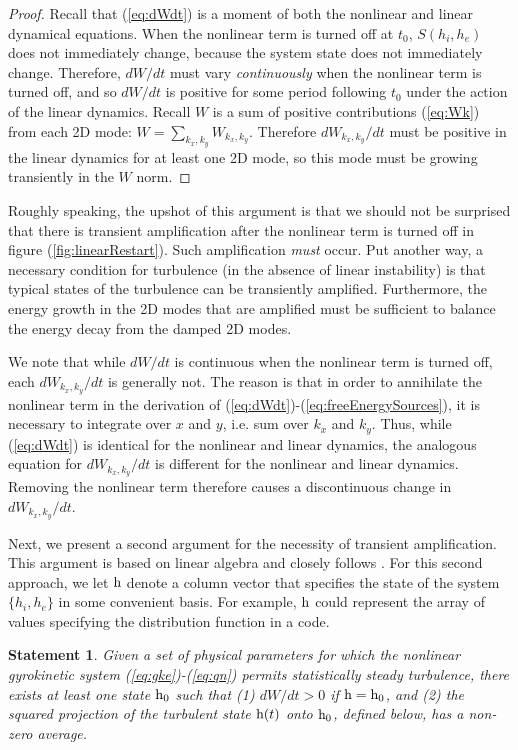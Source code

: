 \documentclass{jpp}
\newtheorem{statement}{Statement}
\begin{document}
\begin{proof}
Recall that (\ref{eq:dWdt}) is a moment of both the nonlinear and linear dynamical equations.
When the nonlinear term is turned off at $t_0$, $S(h_i,h_e)$ does not immediately change, because
the system state does not immediately change. Therefore, $dW/dt$ must vary \emph{continuously}
when the nonlinear term is turned off, and so $dW/dt$ is positive for some period following $t_0$ under the
action of the linear dynamics.
Recall $W$ is a sum of positive contributions (\ref{eq:Wk}) from each 2D mode:
$W = \sum_{k_x,k_y} W_{k_x,k_y}$.
Therefore $dW_{k_x,k_y}/dt$ must be positive in the linear dynamics for at least one 2D mode,
so this mode must be growing transiently in the $W$ norm.
\end{proof}

Roughly speaking, the upshot of this argument is that we should not be surprised that there is transient amplification
after the nonlinear term is turned off in figure (\ref{fig:linearRestart}).
Such amplification \emph{must} occur.
Put another way, a necessary condition
for turbulence (in the absence of linear instability) is that typical states of the turbulence
can be transiently amplified. Furthermore, the energy growth in the 2D modes that are amplified
must be sufficient to balance the energy decay from the damped 2D modes.

We note that while $dW/dt$ is continuous when the nonlinear term is
turned off, each $dW_{k_x,k_y}/dt$ is generally not. The reason is
that in order to annihilate the nonlinear term in the derivation of
(\ref{eq:dWdt})-(\ref{eq:freeEnergySources}), it is necessary to
integrate over $x$ and $y$, i.e. sum over $k_x$ and $k_y$. Thus, while
(\ref{eq:dWdt}) is identical for the nonlinear and linear dynamics,
the analogous equation for $dW_{k_x,k_y}/dt$ is different for the
nonlinear and linear dynamics. Removing the nonlinear term therefore
causes a discontinuous change in $dW_{k_x,k_y}/dt$.

Next, we present a second argument for the necessity of transient amplification.
This argument is based on linear algebra and closely follows \citet{DelSoleNecessity}.
For this second approach, we let $\boldsymbol{$h$}$ denote
a column vector that specifies the state of the system $\{h_i,h_e\}$ in some convenient basis.
For example, $\boldsymbol{$h$}$ could represent the array of values specifying the distribution function in a code.

\begin{statement}
Given a set of physical parameters for which
the nonlinear gyrokinetic system (\ref{eq:gke})-(\ref{eq:qn})
permits statistically steady turbulence,
there exists at least one state $\boldsymbol{$h$}_0$ such that
(1) $dW/dt>0$ if $\boldsymbol{$h$} = \boldsymbol{$h$}_0$, and
(2) the squared projection of the turbulent state $\boldsymbol{$h$}(t)$
onto $\boldsymbol{$h$}_0$, defined below, has a non-zero average.
\end{statement}
\end{document}
